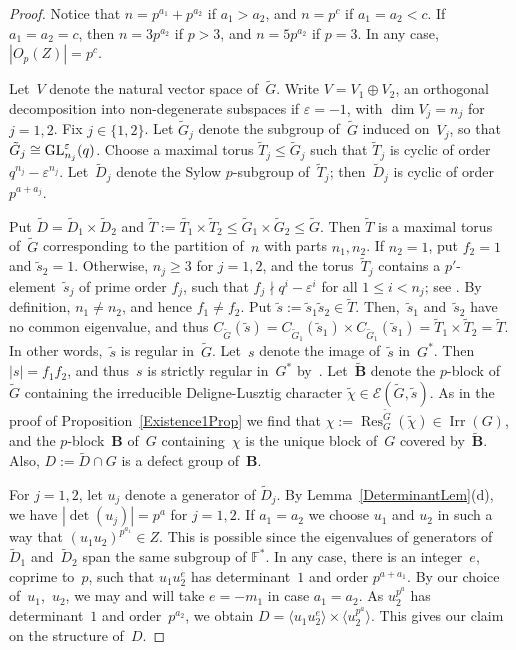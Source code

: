 \documentclass[12pt]{amsart}
\newcommand{\bB}{{\mathbf{B}}}
\def\GL{ \text{\rm GL} }
\DeclareMathOperator{\Res}{Res}               %
\DeclareMathOperator{\Irr}{Irr}
\theoremstyle{theorem}
\theoremstyle{definition}
\theoremstyle{remark}
\begin{document}
\begin{proof}
Notice that $n = p^{a_1} + p^{a_2}$ if $a_1 > a_2$, and $n = p^c$ if 
$a_1 = a_2 < c$. If $a_1 = a_2 = c$, then $n = 3p^{a_2}$ if $p > 3$, and 
$n = 5p^{a_2}$ if $p = 3$. In any case, $|O_p( Z )| = p^c$.

Let~$V$ denote the natural vector space of~$\tilde{G}$. Write 
$V = V_1 \oplus V_2$, an orthogonal decomposition into non-degenerate subspaces 
if $\varepsilon = -1$, with $\dim V_j = n_j$ for $j = 1, 2$. Fix 
$j \in \{ 1, 2 \}$. Let $\tilde{G}_j$ denote the subgroup of~$\tilde{G}$ induced 
on~$V_j$, so that $\tilde{G}_j \cong \GL_{n_j}^\varepsilon( q )$. Choose a 
maximal torus $\tilde{T}_{j} \leq \tilde{G}_j$ such that $\tilde{T}_{j}$ is 
cyclic of order $q^{n_j} - \varepsilon^{n_j}$. Let~$\tilde{D}_{j}$ denote the 
Sylow $p$-subgroup of~$\tilde{T}_{j}$; then~$\tilde{D}_j$ is cyclic of 
order~$p^{a+a_j}$. 

Put $\tilde{D} = \tilde{D}_{1} \times \tilde{D}_{2}$ and
$\tilde{T} := \tilde{T_1} \times \tilde{T}_2 \leq 
\tilde{G}_1 \times \tilde{G}_2 \leq \tilde{G}$. Then $\tilde{T}$ is a maximal
torus of~$\tilde{G}$ corresponding to the partition of~$n$ with parts 
$n_1, n_2$.  If $n_2 = 1$, put $f_2 = 1$ and $\tilde{s}_2 = 1$. Otherwise, 
$n_j \geq 3$ for $j = 1, 2$, and the torus~$\tilde{T}_j$ contains a 
$p'$-element~$\tilde{s}_j$ of prime order $f_j$, such that 
$f_j \nmid q^i - \varepsilon^i$ for all $1 \leq i < n_j$; see 
\cite[Lemma~$3.6.3$]{HL25}.
By definition, $n_1 \neq n_2$, and hence $f_1 \neq f_2$.
Put $\tilde{s} := \tilde{s}_1\tilde{s}_2 \in \tilde{T}$. Then,~$\tilde{s}_1$ 
and~$\tilde{s}_2$ have no common eigenvalue, and thus
$C_{\tilde{G}}( \tilde{s} ) = 
C_{\tilde{G}_1}( \tilde{s}_1 ) \times C_{\tilde{G}_1}( \tilde{s}_1 ) = 
\tilde{T}_1 \times \tilde{T}_2 = \tilde{T}$. In other words,~$\tilde{s}$ is 
regular in~$\tilde{G}$. Let~$s$ denote the image of~$\tilde{s}$ in~$G^*$. Then
$|s| = f_1f_2$, and thus~$s$ is strictly regular in~$G^*$ 
by~\cite[$2.5.1$]{HL25}.
Let~$\tilde{\bB}$ denote the $p$-block of~$\tilde{G}$ containing the irreducible 
Deligne-Lusztig character $\tilde{\chi} \in \mathcal{E}( \tilde{G}, \tilde{s} )$. 
As in the proof of
Proposition~\ref{Existence1Prop} we find that
$\chi := \Res^{\tilde{G}}_G( \tilde{\chi} ) \in \Irr( G )$, and
the $p$-block~$\bB$ of~$G$ containing~$\chi$ is the unique block of~$G$ 
covered by~$\tilde{\bB}$. Also, $D := \tilde{D} \cap G$ is a defect group 
of~$\bB$.

For $j = 1, 2$, let $u_j$ denote a generator of $\tilde{D}_j$. By 
Lemma~\ref{DeterminantLem}(d), we have $|\det(u_j)| = p^{a}$ for $j = 1, 2$. 
If $a_1 = a_2$ we choose $u_1$ and $u_2$ in such a way that 
$(u_1u_2)^{p^{a_1}} \in Z$. This is possible since the eigenvalues of generators 
of~$\tilde{D}_1$ and~$\tilde{D}_2$ span the same subgroup of $\mathbb{F}^*$.
In any case, there is an integer~$e$, coprime to~$p$, such that $u_1u_2^{e}$ has 
determinant~$1$ and order $p^{a+a_1}$. By our choice of~$u_1$,~$u_2$, we may and 
will take $e = -m_1$ in case $a_1 = a_2$.
As $u_2^{p^a}$ has determinant~$1$ and order~$p^{a_2}$, we obtain
$D = \langle u_1u_2^{e} \rangle \times \langle u_2^{p^a} \rangle$. This gives our 
claim on the structure of~$D$.


\end{proof}
\end{document}
